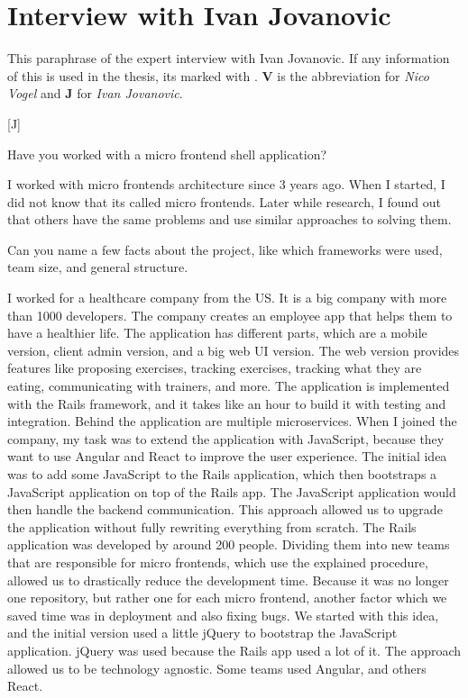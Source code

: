 
\section{Interview with Ivan Jovanovic}

This paraphrase of the expert interview with Ivan Jovanovic.
If any information of this is used in the thesis, its marked with \cite{Vogel.2020.Jovanovic}.
\textbf{V} is the abbreviation for \textit{Nico Vogel} and \textbf{J} for \textit{Ivan Jovanovic}.

[J]

\begin{description}
    \NicoVogel Have you worked with a micro frontend shell application?

    \IvanJovanovic I worked with micro frontends architecture since 3 years ago. When I started, I did not know that its called micro frontends. Later while research, I found out that others have the same problems and use similar approaches to solving them.

    \NicoVogel Can you name a few facts about the project, like which frameworks were used, team size, and general structure.

    \IvanJovanovic I worked for a healthcare company from the US. It is a big company with more than 1000 developers. The company creates an employee app that helps them to have a healthier life. The application has different parts, which are a mobile version, client admin version, and a big web UI version. The web version provides features like proposing exercises, tracking exercises, tracking what they are eating, communicating with trainers, and more. The application is implemented with the Rails framework, and it takes like an hour to build it with testing and integration. Behind the application are multiple microservices.
    When I joined the company, my task was to extend the application with JavaScript, because they want to use Angular and React to improve the user experience. The initial idea was to add some JavaScript to the Rails application, which then bootstraps a JavaScript application on top of the Rails app. The JavaScript application would then handle the backend communication. This approach allowed us to upgrade the application without fully rewriting everything from scratch.
    The Rails application was developed by around 200 people. Dividing them into new teams that are responsible for micro frontends, which use the explained procedure, allowed us to drastically reduce the development time. Because it was no longer one repository, but rather one for each micro frontend, another factor which we saved time was in deployment and also fixing bugs.
    We started with this idea, and the initial version used a little jQuery to bootstrap the JavaScript application. jQuery was used because the Rails app used a lot of it. The approach allowed us to be technology agnostic. Some teams used Angular, and others React.


\end{description}
